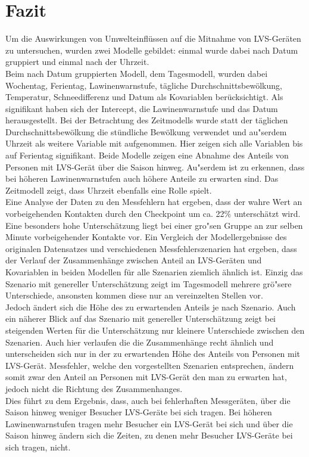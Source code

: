 \documentclass[12pt]{scrreprt}
\begin{document}
\chapter{Fazit}
Um die Auswirkungen von Umwelteinflüssen auf die Mitnahme von LVS-Geräten zu untersuchen, wurden zwei Modelle gebildet: einmal wurde dabei nach Datum gruppiert und einmal nach der Uhrzeit. \\
Beim nach Datum gruppierten Modell, dem Tagesmodell, wurden dabei Wochentag, Ferientag, Lawinenwarnstufe, tägliche Durchschnittsbewölkung, Temperatur, Schneedifferenz  und Datum als Kovariablen berücksichtigt.
Als signifikant haben sich der Intercept, die Lawinenwarnstufe und das Datum herausgestellt. Bei der Betrachtung des Zeitmodells wurde statt der täglichen Durchschnittsbewölkung die stündliche Bewölkung verwendet und au"serdem Uhrzeit als weitere Variable mit aufgenommen. Hier zeigen sich alle Variablen bis auf Ferientag signifikant. Beide Modelle zeigen eine Abnahme des Anteils von Personen mit LVS-Gerät über die Saison hinweg. Au"serdem ist zu erkennen, dass bei höheren Lawinenwarnstufen auch höhere Anteile zu erwarten sind. Das Zeitmodell zeigt, dass Uhrzeit ebenfalls eine Rolle spielt. \\
Eine Analyse der Daten zu den Messfehlern hat ergeben, dass der wahre Wert an vorbeigehenden Kontakten durch den Checkpoint um ca. 22\% unterschätzt wird. Eine besonders hohe Unterschätzung liegt bei einer gro"sen Gruppe an zur selben Minute vorbeigehender Kontakte vor. Ein Vergleich der Modellergebnisse des originalen Datensatzes und verschiedenen Messfehlerszenarien hat ergeben, dass der Verlauf der Zusammenhänge zwischen Anteil an LVS-Geräten und Kovariablen in beiden Modellen für alle Szenarien ziemlich ähnlich ist. Einzig das Szenario mit genereller Unterschätzung zeigt im Tagesmodell mehrere grö"sere Unterschiede, ansonsten kommen diese nur an vereinzelten Stellen vor. \\ Jedoch ändert sich die Höhe des zu erwartenden Anteils je nach Szenario. Auch ein näherer Blick auf das Szenario mit genereller Unterschätzung zeigt bei steigenden Werten für die Unterschätzung nur kleinere Unterschiede zwischen den Szenarien. Auch hier verlaufen die die Zusammenhänge recht ähnlich und unterscheiden sich nur in der zu erwartenden Höhe des Anteils von Personen mit LVS-Gerät. Messfehler, welche den vorgestellten Szenarien entsprechen, ändern somit zwar den Anteil an Personen mit LVS-Gerät den man zu erwarten hat, jedoch nicht die Richtung des Zusammenhanges. \\
Dies führt zu dem Ergebnis, dass, auch bei fehlerhaften Messgeräten, über die Saison hinweg weniger Besucher LVS-Geräte bei sich tragen. Bei höheren Lawinenwarnstufen tragen mehr Besucher ein LVS-Gerät bei sich und über die Saison hinweg ändern sich die Zeiten, zu denen mehr Besucher LVS-Geräte bei sich tragen, nicht.
\end{document}
